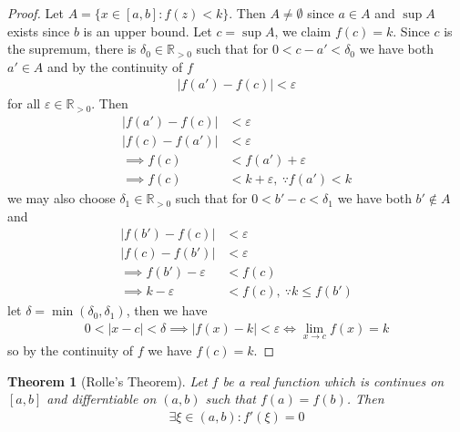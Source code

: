 \documentclass[a4paper,11pt]{article}
\theoremstyle{plain}
\newtheorem{theorem}{Theorem}
\theoremstyle{definition}
\newcommand{\R}{\mathbb{R}}
\newcommand{\iff}{\Longleftrightarrow}
\begin{document}
\begin{proof}
	Let $A=\{x\in[a,b]:f(z)<k\}$. Then $A\neq\emptyset$ since
	$a\in A$ and $\sup A$ exists since $b$ is an upper bound. Let
	$c =\sup A$, we claim $f(c)=k$.  Since $c$ is the supremum,
	there is $\delta_0\in\R_{>0}$ such that for $0<c-a'<\delta_0$
	we have both $a'\in A$ and by the continuity of $f$
	\begin{equation}
	\begin{aligned}
		|f(a')-f(c)|<\varepsilon
	\end{aligned}
	\end{equation}
	for all $\varepsilon\in\R_{>0}$. Then 
	\begin{equation}
	\begin{aligned}
		|f(a')-f(c)|&<\varepsilon\\
		|f(c)-f(a')|&<\varepsilon\\
		\implies f(c)&<f(a')+\varepsilon\\
		\implies f(c)&<k+\varepsilon,\ \because f(a')<k
	\end{aligned}
	\end{equation}
	we may also choose $\delta_1\in\R_{>0}$ such that for $0<b'-c<\delta_1$ we
	have both $b'\notin A$ and
	\begin{equation}
	\begin{aligned}
		|f(b')-f(c)|&<\varepsilon\\
		|f(c)-f(b')|&<\varepsilon\\
		\implies f(b')-\varepsilon&<f(c)\\
		\implies k-\varepsilon&<f(c),\ \because k\leq f(b')
	\end{aligned}
	\end{equation}
	let $\delta=\min(\delta_0,\delta_1)$, then we have
	\begin{equation}
	\begin{aligned}
		0<|x-c|<\delta\implies |f(x)-k|<\varepsilon \iff \lim_{x\rightarrow
		c}f(x)=k
	\end{aligned}
	\end{equation}
	so by the continuity of $f$ we have $f(c)=k$.
\end{proof}
\begin{theorem}[Rolle's Theorem]
	Let $f$ be a real function which is continues on $[a,b]$ and differntiable
	on $(a,b)$ such that $f(a)=f(b)$. Then
	\begin{equation}
	\begin{aligned}
		\exists \xi \in (a,b):f'(\xi) =0
	\end{aligned}
	\end{equation}
\end{theorem}
\end{document}

